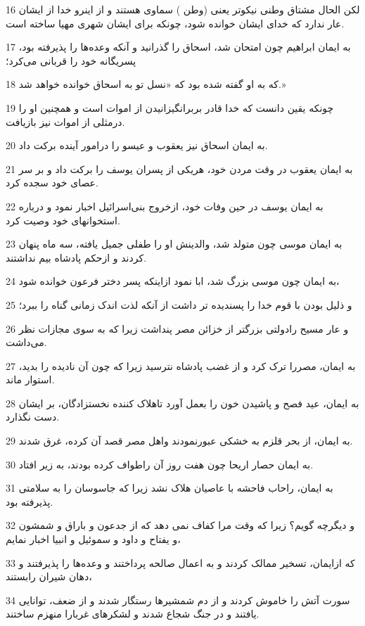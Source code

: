 \par 16 لکن الحال مشتاق وطنی نیکوتر یعنی (وطن ) سماوی هستند و از اینرو خدا از ایشان عار ندارد که خدای ایشان خوانده شود، چونکه برای ایشان شهری مهیا ساخته است.
\par 17 به ایمان ابراهیم چون امتحان شد، اسحاق را گذرانید و آنکه وعده‌ها را پذیرفته بود، پسریگانه خود را قربانی می‌کرد؛
\par 18 که به او گفته شده بود که «نسل تو به اسحاق خوانده خواهد شد.»
\par 19 چونکه یقین دانست که خدا قادر بربرانگیزانیدن از اموات است و همچنین او را درمثلی از اموات نیز باز‌یافت.
\par 20 به ایمان اسحاق نیز یعقوب و عیسو را درامور آینده برکت داد.
\par 21 به ایمان یعقوب در وقت مردن خود، هریکی از پسران یوسف را برکت داد و بر سر عصای خود سجده کرد.
\par 22 به ایمان یوسف در حین وفات خود، ازخروج بنی‌اسرائیل اخبار نمود و درباره استخوانهای خود وصیت کرد.
\par 23 به ایمان موسی چون متولد شد، والدینش او را طفلی جمیل یافته، سه ماه پنهان کردند و ازحکم پادشاه بیم نداشتند.
\par 24 به ایمان چون موسی بزرگ شد، ابا نمود ازاینکه پسر دختر فرعون خوانده شود،
\par 25 و ذلیل بودن با قوم خدا را پسندیده تر داشت از آنکه لذت اندک زمانی گناه را ببرد؛
\par 26 و عار مسیح رادولتی بزرگتر از خزائن مصر پنداشت زیرا که به سوی مجازات نظر می‌داشت.
\par 27 به ایمان، مصررا ترک کرد و از غضب پادشاه نترسید زیرا که چون آن نادیده را بدید، استوار ماند.
\par 28 به ایمان، عید فصح و پاشیدن خون را بعمل آورد تاهلاک کننده نخستزادگان، بر ایشان دست نگذارد.
\par 29 به ایمان، از بحر قلزم به خشکی عبورنمودند واهل مصر قصد آن کرده، غرق شدند.
\par 30 به ایمان حصار اریحا چون هفت روز آن راطواف کرده بودند، به زیر افتاد.
\par 31 به ایمان، راحاب فاحشه با عاصیان هلاک نشد زیرا که جاسوسان را به سلامتی پذیرفته بود.
\par 32 و دیگر‌چه گویم؟ زیرا که وقت مرا کفاف نمی دهد که از جدعون و باراق و شمشون و یفتاح و داود و سموئیل و انبیا اخبار نمایم،
\par 33 که ازایمان، تسخیر ممالک کردند و به اعمال صالحه پرداختند و وعده‌ها را پذیرفتند و دهان شیران رابستند،
\par 34 سورت آتش را خاموش کردند و از دم شمشیرها رستگار شدند و از ضعف، توانایی یافتند و در جنگ شجاع شدند و لشکرهای غربارا منهزم ساختند.
